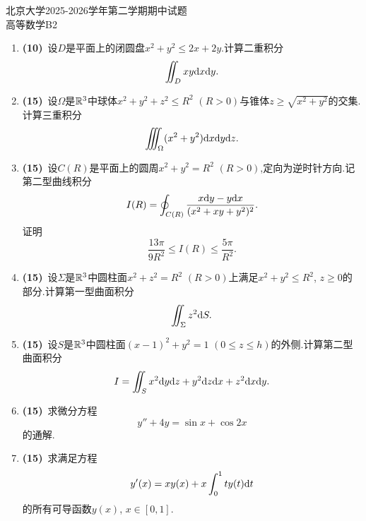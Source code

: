 \documentclass{ctexart}
\begin{document}
\pagestyle{empty}
\begin{center}\Large
    北京大学2025-2026学年第二学期期中试题\\
    高等数学B2
\end{center}
\begin{enumerate}[leftmargin=*,label=\textbf{\arabic*.}]
    \item \textbf{(10)}\ 设$D$是平面上的闭圆盘$x^2+y^2\leqslant2x+2y$.计算二重积分
    \[\iint_Dxy\mathrm{d} x\mathrm{d} y.\]

    \item \textbf{(15)}\ 设$\Omega$是$\mathbb{R}^3$中球体$x^2+y^2+z^2\leqslant R^2$ $(R>0)$与锥体$z\geqslant\sqrt{x^2+y^2}$的交集.计算三重积分
    \[\iiint_\Omega(x^2+y^2)\mathrm{d} x\mathrm{d} y\mathrm{d} z.\]

    \item \textbf{(15)}\ 设$C(R)$是平面上的圆周$x^2+y^2=R^2$ $(R>0)$,定向为逆时针方向.记第二型曲线积分
    \[I(R)=\oint_{C(R)}\dfrac{x\mathrm{d} y-y\mathrm{d} x}{(x^2+xy+y^2)^2}.\]
    证明
    \[\dfrac{13\pi}{9R^2}\leqslant I(R)\leqslant\dfrac{5\pi}{R^2}.\]

    \item \textbf{(15)}\ 设$\Sigma$是$\mathbb{R}^3$中圆柱面$x^2+z^2=R^2$ $(R>0)$上满足$x^2+y^2\leqslant R^2$, $z\geqslant0$的部分.计算第一型曲面积分
    \[\iint_\Sigma z^2\mathrm{d} S.\]

    \item \textbf{(15)}\ 设$S$是$\mathbb{R}^3$中圆柱面$(x-1)^2+y^2=1$ $(0\leqslant z\leqslant h)$的外侧.计算第二型曲面积分
    \[I=\iint_Sx^2\mathrm{d} y\mathrm{d} z+y^2\mathrm{d} z\mathrm{d} x+z^2\mathrm{d} x\mathrm{d} y.\]

    \item \textbf{(15)}\ 求微分方程
    \[y''+4y=\sin x+\cos2x\]
    的通解.

    \item \textbf{(15)}\ 求满足方程
    \[y'(x)=xy(x)+x\int_0^1ty(t)\mathrm{d} t\]
    的所有可导函数$y(x)$, $x\in[0,1]$.

\end{enumerate}
\end{document}
